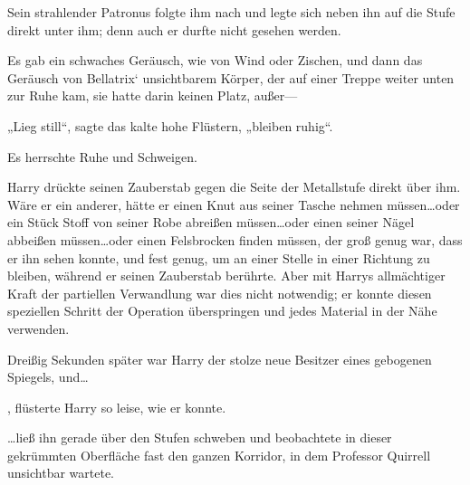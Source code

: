 Sein strahlender Patronus folgte ihm nach und legte sich neben ihn auf die Stufe direkt unter ihm; denn auch er durfte nicht gesehen werden.

Es gab ein schwaches Geräusch, wie von Wind oder Zischen, und dann das Geräusch von Bellatrix‘ unsichtbarem Körper, der auf einer Treppe weiter unten zur Ruhe kam, sie hatte darin keinen Platz, außer—

„Lieg still“, sagte das kalte hohe Flüstern, „bleiben ruhig“.

Es herrschte Ruhe und Schweigen.

Harry drückte seinen Zauberstab gegen die Seite der Metallstufe direkt über ihm. Wäre er ein anderer, hätte er einen Knut aus seiner Tasche nehmen müssen…oder ein Stück Stoff von seiner Robe abreißen müssen…oder einen seiner Nägel abbeißen müssen…oder einen Felsbrocken finden müssen, der groß genug war, dass er ihn sehen konnte, und fest genug, um an einer Stelle in einer Richtung zu bleiben, während er seinen Zauberstab berührte. Aber mit Harrys allmächtiger Kraft der partiellen Verwandlung war dies nicht notwendig; er konnte diesen speziellen Schritt der Operation überspringen und jedes Material in der Nähe verwenden.

Dreißig Sekunden später war Harry der stolze neue Besitzer eines gebogenen Spiegels, und…

, flüsterte Harry so leise, wie er konnte.

…ließ ihn gerade über den Stufen schweben und beobachtete in dieser gekrümmten Oberfläche fast den ganzen Korridor, in dem Professor Quirrell unsichtbar wartete.

